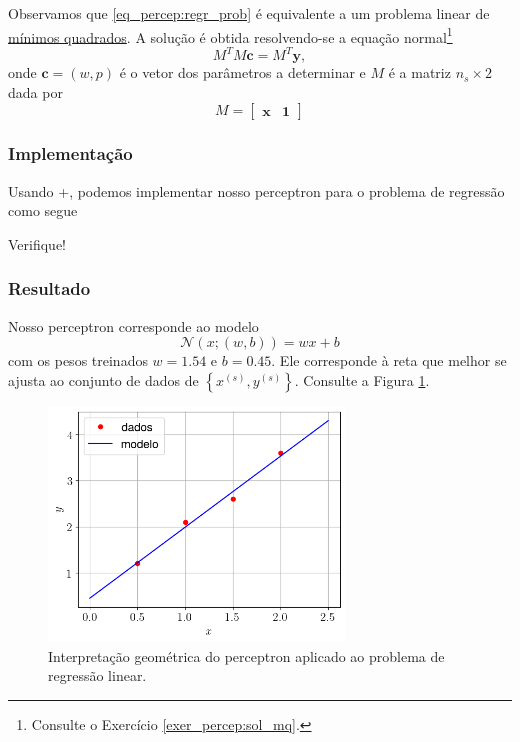 Observamos que \eqref{eq_percep:regr_prob} é equivalente a um problema linear de \href{https://notaspedrok.com.br/notas/MatematicaNumerica/cap_ajuste_sec_prob_lin.html}{mínimos quadrados}. A solução é obtida resolvendo-se a equação normal\footnote{Consulte o Exercício \ref{exer_percep:sol_mq}.}
\begin{equation}\label{eq_percep:sol_mq}
  M^TM\pmb{c} = M^T\pmb{y},
\end{equation}
onde $\pmb{c} = (w, p)$ é o vetor dos parâmetros a determinar e $M$ é a matriz $n_s\times 2$ dada por
\begin{equation}
  M =
  \begin{bmatrix}
    \pmb{x} & \pmb{1}
  \end{bmatrix}
\end{equation}

\subsubsection{Implementação}

\ifispython
Usando {\python}+{\pytorch}, podemos implementar nosso perceptron para o problema de regressão como segue



Verifique!
\fi

\subsubsection{Resultado}

Nosso perceptron corresponde ao modelo
\begin{equation}
  \mathcal{N}(x; (w,b)) = wx + b
\end{equation}
com os pesos treinados $w = 1.54$ e $b = 0.45$. Ele corresponde à reta que melhor se ajusta ao conjunto de dados de $\left\{x^{(s)}, y^{(s)}\right\}$. Consulte a Figura \ref{fig:percep_mq}.

\begin{figure}[H]
  \centering
  \includegraphics[width=0.7\textwidth]{./cap_perceptron/dados/fig_percep_mq/main}
  \caption{Interpretação geométrica do perceptron aplicado ao problema de regressão linear.}
  \label{fig:percep_mq}
\end{figure}

